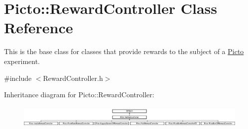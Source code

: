 \hypertarget{class_picto_1_1_reward_controller}{\section{Picto\-:\-:Reward\-Controller Class Reference}
\label{class_picto_1_1_reward_controller}
}


This is the base class for classes that provide rewards to the subject of a \hyperlink{namespace_picto}{Picto} experiment.  




{\ttfamily \#include $<$Reward\-Controller.\-h$>$}

Inheritance diagram for Picto\-:\-:Reward\-Controller\-:\begin{figure}[H]
\begin{center}
\leavevmode
\includegraphics[height=1.111111cm]{class_picto_1_1_reward_controller}
\end{center}
\end{figure}
